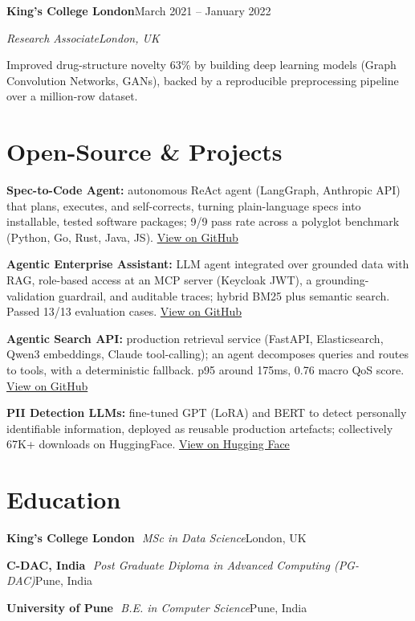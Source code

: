 \documentclass[10pt,a4paper]{article}
\newcommand{\entry}[4]{%
  {\color{company}\bfseries #1}\hfill {\color{muted}#2}\par
  \vspace{1pt}
  {\itshape #3}\hfill {\color{muted}\itshape #4}\par
  \vspace{3pt}%
}
\newcommand{\sep}{\,\textcolor{accent!60}{\textbar}\,}
\begin{document}
\entry{King's College London}{March 2021 -- January 2022}{Research Associate}{London, UK}
\begin{tight}
  \item Improved drug-structure novelty 63\% by building deep learning models (Graph Convolution Networks, GANs), backed by a reproducible preprocessing pipeline over a million-row dataset.
\end{tight}

\section{Open-Source \& Projects}
\begin{tight}
  \item \textbf{Spec-to-Code Agent:} autonomous ReAct agent (LangGraph, Anthropic API) that plans, executes, and self-corrects, turning plain-language specs into installable, tested software packages; 9/9 pass rate across a polyglot benchmark (Python, Go, Rust, Java, JS). \href{https://github.com/abhijeetscode/Spec-to-Code-Agent}{View on GitHub}
  \item \textbf{Agentic Enterprise Assistant:} LLM agent integrated over grounded data with RAG, role-based access at an MCP server (Keycloak JWT), a grounding-validation guardrail, and auditable traces; hybrid BM25 plus semantic search. Passed 13/13 evaluation cases. \href{https://github.com/abhijeetscode/Agentic-Enterprise-Assistant}{View on GitHub}
  \item \textbf{Agentic Search API:} production retrieval service (FastAPI, Elasticsearch, Qwen3 embeddings, Claude tool-calling); an agent decomposes queries and routes to tools, with a deterministic fallback. p95 around 175ms, 0.76 macro QoS score. \href{https://github.com/abhijeetscode/search-agent}{View on GitHub}
  \item \textbf{PII Detection LLMs:} fine-tuned GPT (LoRA) and BERT to detect personally identifiable information, deployed as reusable production artefacts; collectively 67K+ downloads on HuggingFace. \href{https://huggingface.co/ab-ai/pii_model}{View on Hugging Face}
\end{tight}

\section{Education}
{\color{company}\bfseries King's College London} \sep {\itshape MSc in Data Science}\hfill {\color{muted}London, UK}\par\vspace{1pt}
{\color{company}\bfseries C-DAC, India} \sep {\itshape Post Graduate Diploma in Advanced Computing (PG-DAC)}\hfill {\color{muted}Pune, India}\par\vspace{1pt}
{\color{company}\bfseries University of Pune} \sep {\itshape B.E. in Computer Science}\hfill {\color{muted}Pune, India}\par
\end{document}
